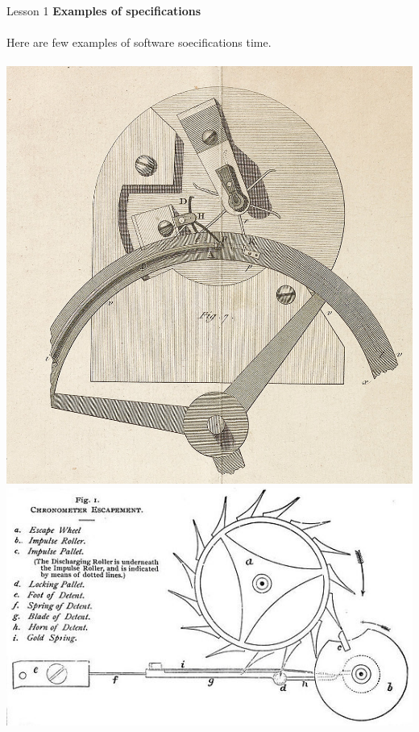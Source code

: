 \documentclass[aspectratio=1610]{beamer}
\begin{document}
\begin{frame}{Lesson 1}{}
\Large
\textbf{Examples of specifications}\\~\\
Here are few examples of software soecifications
time.\\~\\
\includegraphics[scale=0.15]{Images/Le_Roy_escapement_mechanism}
\includegraphics[scale=0.25]{Images/chronometer_detent_escapement}

\end{frame}
\end{document}

